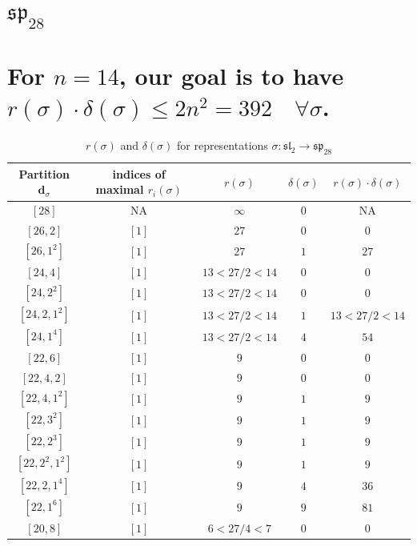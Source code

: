 \documentclass{article}%
\begin{document}
%
\section{$\mathfrak{sp}_{28}$}%
\section*{For $n=14$, our goal is to have $r(\sigma) \cdot \delta(\sigma) \leq 2n^2 = 392 \quad \forall \sigma$.}%

%
\linebreak%

    \begin{center}
    \label{table:sp_28}
    \begin{longtable}{||c|c|c|c|c||}
    \caption{$r(\sigma)$ and $\delta(\sigma)$ for representations $\sigma: \mathfrak{sl}_2 \to \mathfrak{sp}_{28}$}
    \hline
    Partition $\textbf{d}_\sigma$
    &indices of maximal $r_i(\sigma)$
    &$r(\sigma)$
    &$\delta(\sigma)$
    &$r(\sigma) \cdot \delta(\sigma)$
    \\ [0.3ex] \hline\endhead
    $[28]$ & NA & $\infty$ & $0$ & NA \\ \hline 
$[26, 2]$ & $[1]$ & $27$ & $0$ & $0$ \\ \hline 
$[26, 1^{2}]$ & $[1]$ & $27$ & $1$ & $27$ \\ \hline 
$[24, 4]$ & $[1]$ & $13 < 27/2 < 14$ & $0$ & $0$ \\ \hline 
$[24, 2^{2}]$ & $[1]$ & $13 < 27/2 < 14$ & $0$ & $0$ \\ \hline 
$[24, 2, 1^{2}]$ & $[1]$ & $13 < 27/2 < 14$ & $1$ & $13 < 27/2 < 14$ \\ \hline 
$[24, 1^{4}]$ & $[1]$ & $13 < 27/2 < 14$ & $4$ & $54$ \\ \hline 
$[22, 6]$ & $[1]$ & $9$ & $0$ & $0$ \\ \hline 
$[22, 4, 2]$ & $[1]$ & $9$ & $0$ & $0$ \\ \hline 
$[22, 4, 1^{2}]$ & $[1]$ & $9$ & $1$ & $9$ \\ \hline 
$[22, 3^{2}]$ & $[1]$ & $9$ & $1$ & $9$ \\ \hline 
$[22, 2^{3}]$ & $[1]$ & $9$ & $1$ & $9$ \\ \hline 
$[22, 2^{2}, 1^{2}]$ & $[1]$ & $9$ & $1$ & $9$ \\ \hline 
$[22, 2, 1^{4}]$ & $[1]$ & $9$ & $4$ & $36$ \\ \hline 
$[22, 1^{6}]$ & $[1]$ & $9$ & $9$ & $81$ \\ \hline 
$[20, 8]$ & $[1]$ & $6 < 27/4 < 7$ & $0$ & $0$ \\ \hline 

\end{longtable}
\end{center}
\end{document}
